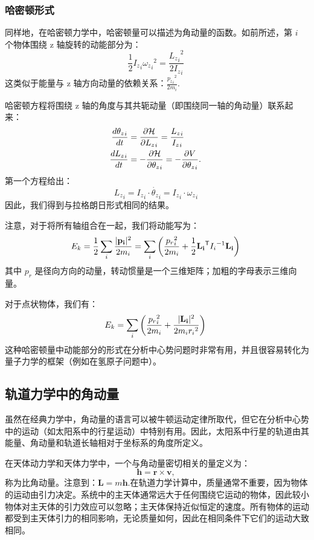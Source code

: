 \subsubsection{哈密顿形式}
同样地，在哈密顿力学中，哈密顿量可以描述为角动量的函数。如前所述，第 \(i\) 个物体围绕 z 轴旋转的动能部分为：
\[
\frac{1}{2}{I_{z}}_{i}{{\omega_{z}}_{i}}^{2} = \frac{{{L_{z}}_{i}}^{2}}{2{I_{z}}_{i}}~
\]
这类似于能量与 z 轴方向动量的依赖关系：\(\frac{{{p_{z}}_{i}}^{2}}{2m_{i}}\).

哈密顿方程将围绕 z 轴的角度与其共轭动量（即围绕同一轴的角动量）联系起来：
\[
\begin{aligned}
\frac{d{\theta_{z}}_{i}}{dt} &= \frac{\partial {\cal H}}{\partial {L_{z}}_{i}} = \frac{{L_{z}}_{i}}{{I_{z}}_{i}} \\
\frac{d{L_{z}}_{i}}{dt} &= -\frac{\partial {\cal H}}{\partial {\theta_{z}}_{i}} = -\frac{\partial V}{\partial {\theta_{z}}_{i}}.
\end{aligned}~
\]
第一个方程给出：
\[
{L_{z}}_{i} = {I_{z}}_{i} \cdot {\dot{\theta_{z}}_{i}} = {I_{z}}_{i} \cdot {\omega_{z}}_{i}~
\]
因此，我们得到与拉格朗日形式相同的结果。 

注意，对于将所有轴组合在一起，我们将动能写为：
\[
E_{k} = \frac{1}{2} \sum_{i} \frac{|{\bf{p}_{i}}|^{2}}{2m_{i}} = \sum_{i} \left( \frac{{p_{r}}_{i}^{2}}{2m_{i}} + \frac{1}{2} {\bf{L}_{i}}^{\textsf{T}} {I_{i}}^{-1} {\bf{L}_{i}} \right)~
\]
其中 \(p_{r}\) 是径向方向的动量，转动惯量是一个三维矩阵；加粗的字母表示三维向量。

对于点状物体，我们有：
\[
E_{k} = \sum_{i} \left( \frac{{p_{r}}_{i}^{2}}{2m_{i}} + \frac{|{\bf{L}_{i}}|^{2}}{2m_{i}{r_{i}}^{2}} \right)~
\]
这种哈密顿量中动能部分的形式在分析中心势问题时非常有用，并且很容易转化为量子力学的框架（例如在氢原子问题中）。 
\subsection{轨道力学中的角动量} 
虽然在经典力学中，角动量的语言可以被牛顿运动定律所取代，但它在分析中心势中的运动（如太阳系中的行星运动）中特别有用。因此，太阳系中行星的轨道由其能量、角动量和轨道长轴相对于坐标系的角度所定义。

在天体动力学和天体力学中，一个与角动量密切相关的量定义为：
\[
\mathbf{h} = \mathbf{r} \times \mathbf{v},~
\]
称为比角动量。注意到：\(\mathbf{L} = m\mathbf{h}\).在轨道力学计算中，质量通常不重要，因为物体的运动由引力决定。系统中的主天体通常远大于任何围绕它运动的物体，因此较小物体对主天体的引力效应可以忽略；主天体保持近似恒定的速度。所有物体的运动都受到主天体引力的相同影响，无论质量如何，因此在相同条件下它们的运动大致相同。
